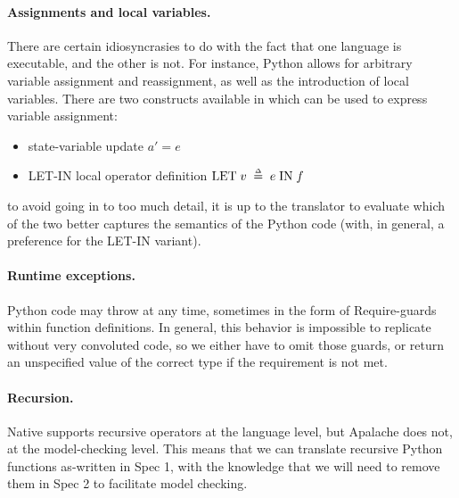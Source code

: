 \paragraph{Assignments and local variables.} There are certain idiosyncrasies to do with the fact that one language is executable, and the other is not. For instance, Python allows for arbitrary variable assignment and reassignment, as well as the introduction of local variables. There are two constructs available in \tlap{} which can be used to express variable assignment:
\begin{itemize}
  \item state-variable update $a' = e$
  \item LET-IN local operator definition $\mathrm{LET}\; v \;\mathrel{\smash {{\stackrel{\scriptscriptstyle\Delta}{=}}}}\; e \;\mathrm{IN}\; f$
\end{itemize}
to avoid going in to too much detail, it is up to the translator to evaluate which of the two better captures the semantics of the Python code (with, in general, a preference for the LET-IN variant).
\paragraph{Runtime exceptions.} Python code may throw at any time, sometimes in the form of $\mathrm{Require}$-guards within function definitions. 
In general, this behavior is impossible to replicate without very convoluted \tlap{} code, so we either have to omit those guards, or return an unspecified value of the correct type if the requirement is not met.
\paragraph{Recursion.} Native \tlap{} supports recursive operators at the language level, but Apalache does not, at the model-checking level. This means that we can translate recursive Python functions as-written in Spec 1, with the knowledge that we will need to remove them in Spec 2 to facilitate model checking.

